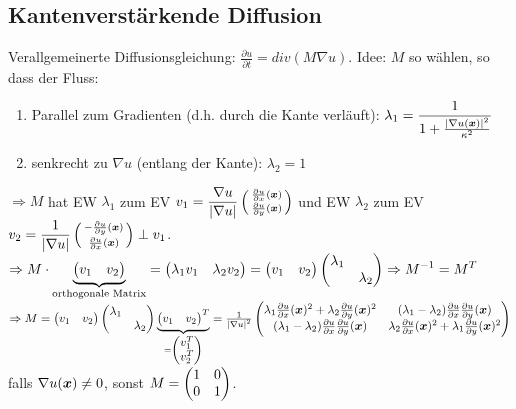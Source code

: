             \subsection{Kantenverstärkende Diffusion}
                Verallgemeinerte Diffusionsgleichung: $\displaystyle \frac{\partial u}{\partial t} = div(M \nabla u)$.
                Idee: $M$ so wählen, so dass der Fluss:
                \begin{enumerate}[label=-]
                    \item Parallel zum Gradienten (d.h. durch die Kante verläuft): $\displaystyle \lambda_1=\frac{1}{1+\frac{\left| \nabla u (\boldsymbol{x}) \right|^2}{\kappa^2}}$
                    \item senkrecht zu $\nabla u$ (entlang der Kante): $\lambda_2=1$
                \end{enumerate}

                $\Rightarrow M$ hat EW $\lambda_1$ zum EV $\displaystyle v_1= \frac{\nabla u}{\left| \nabla u \right|}\left( \begin{smallmatrix} \frac{\partial u}{\partial x}(\boldsymbol{x})\\\frac{\partial u}{\partial y}(\boldsymbol{x}) \end{smallmatrix} \right)$ und EW $\lambda_2$ zum EV $\displaystyle v_2 = \frac{1}{\left| \nabla u \right|} \left( \begin{smallmatrix} -\frac{\partial u}{\partial y}(\boldsymbol{x})\\\frac{\partial u}{\partial x}(\boldsymbol{x}) \end{smallmatrix} \right) \perp v_1$.\\
                $\displaystyle \Rightarrow M \cdot \underbrace{\begin{pmatrix} v_1 & v_2 \end{pmatrix}}_{\small \text{orthogonale Matrix}} = \begin{pmatrix} \lambda_1 v_1 & \lambda_2 v_2 \end{pmatrix} = \begin{pmatrix} v_1 & v_2 \end{pmatrix} \begin{pmatrix} \lambda_1 & \ \\ \ & \lambda_2 \end{pmatrix} \Rightarrow M^{-1} = M^T$\\
                $\Rightarrow M= \begin{pmatrix} v_1 & v_2 \end{pmatrix} \begin{pmatrix} \lambda_1 & \ \\ \ & \lambda_2 \end{pmatrix} \underbrace{\begin{pmatrix} v_1 & v_2 \end{pmatrix}^T}_{=\begin{pmatrix} v_1^T \\ v_2^T \end{pmatrix}} = \frac{1}{\left| \nabla u \right|^2} \begin{pmatrix} \lambda_1 \frac{\partial u}{\partial x}(\boldsymbol{x})^2 + \lambda_2 \frac{\partial u}{\partial y}(\boldsymbol{x})^2  & (\lambda_1 - \lambda_2)\frac{\partial u}{\partial x} \frac{\partial u}{\partial y}(\boldsymbol{x})\\ (\lambda_1 - \lambda_2)\frac{\partial u}{\partial x} \frac{\partial u}{\partial y}(\boldsymbol{x}) & \lambda_2 \frac{\partial u}{\partial x}(\boldsymbol{x})^2 + \lambda_1 \frac{\partial u}{\partial y}(\boldsymbol{x})^2 \end{pmatrix}$\\
                falls $\nabla u(\boldsymbol{x}) \neq 0$, sonst $M= \begin{pmatrix} 1 & 0 \\ 0 & 1 \end{pmatrix}$.

